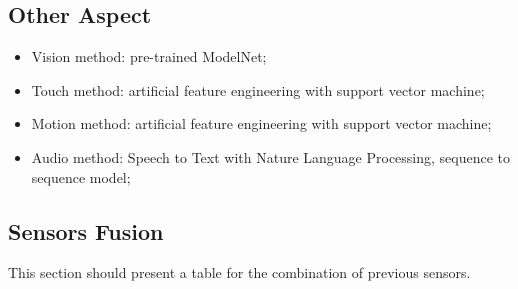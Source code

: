 \subsection{Other Aspect}
\label{subsec:other-model}


\begin{itemize}
  \item Vision method: pre-trained ModelNet;
  \item Touch method: artificial feature engineering with support vector machine;
  \item Motion method: artificial feature engineering with support vector machine;
  \item Audio method: Speech to Text with Nature Language Processing, sequence to sequence model;
\end{itemize}


\subsection{Sensors Fusion}\label{subsec:fusion}


This section should present a table for the combination of previous sensors.
